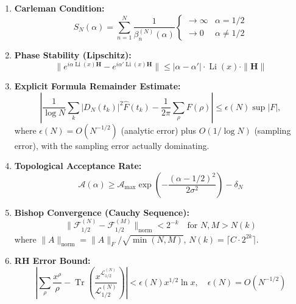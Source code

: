 \documentclass[12pt,a4paper]{amsart}
\theoremstyle{plain}
\theoremstyle{definition}
\theoremstyle{remark}
\begin{document}
\begin{enumerate}
    \item \textbf{Carleman Condition:}
    \begin{equation}
    S_N(\alpha)=\sum_{n=1}^N\frac{1}{\beta_n^{(N)}(\alpha)} \begin{cases} \to\infty & \alpha=1/2 \\ \to0 & \alpha\neq1/2 \end{cases}
    \end{equation}
    
    \item \textbf{Phase Stability (Lipschitz):}
    \begin{equation}
    \| e^{i\alpha\operatorname{Li}(x)\mathbf{H}} - e^{i\alpha'\operatorname{Li}(x)\mathbf{H}}\| \le |\alpha-\alpha'|\cdot\operatorname{Li}(x)\cdot\|\mathbf{H}\|
    \end{equation}
    
    \item \textbf{Explicit Formula Remainder Estimate:}
    \begin{equation}
    \left| \frac{1}{\log N}\sum_{k} |D_N(t_k)|^2 \widehat{F}(t_k) - \frac{1}{2\pi}\sum_{\rho} F(\rho) \right| \le \epsilon(N) \sup|F|,
    \end{equation}
    where $\epsilon(N)=O(N^{-1/2})$ (analytic error) plus $O(1/\log N)$ (sampling error), with the sampling error actually dominating.
    
    \item \textbf{Topological Acceptance Rate:}
    \begin{equation}
    \mathcal{A}(\alpha) \ge \mathcal{A}_{\max}\exp\left(-\frac{(\alpha-1/2)^2}{2\sigma^2}\right)-\delta_N
    \end{equation}
    
    \item \textbf{Bishop Convergence (Cauchy Sequence):}
    \begin{equation}
    \|\mathcal{F}_{1/2}^{(N)}-\mathcal{F}_{1/2}^{(M)}\|_{\mathrm{norm}} < 2^{-k}\quad \text{for } N,M>N(k)
    \end{equation}
    where $\|A\|_{\mathrm{norm}} = \|A\|_F / \sqrt{\min(N,M)}$, $N(k) = \lceil C \cdot 2^{2k} \rceil$.
    
    \item \textbf{RH Error Bound:}
    \begin{equation}
    \left| \sum_\rho \frac{x^\rho}{\rho} - \operatorname{Tr}\left(\frac{x^{\mathcal{L}_{1/2}^{(N)}}}{\mathcal{L}_{1/2}^{(N)}}\right) \right| < \epsilon(N) x^{1/2}\ln x,\quad \epsilon(N)=O(N^{-1/2})
    \end{equation}
\end{enumerate}
\end{document}
